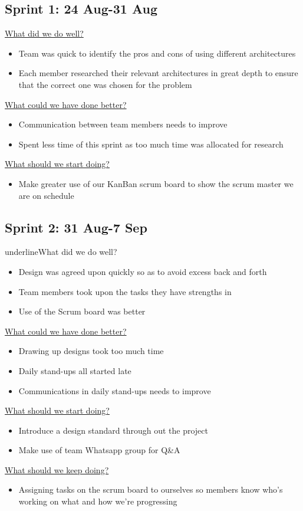 \documentclass[12pt]{article}
\begin{document}
\subsection{Sprint 1: 24 Aug-31 Aug}
\underline{What did we do well?}
\begin{itemize}
\item Team was quick to identify the pros and cons of using different architectures
\item Each member researched their relevant architectures in great depth to ensure that the correct one was chosen for the problem 
\end{itemize}
\underline{What could we have done better?}
\begin{itemize}
\item Communication between team members needs to improve 
\item Spent less time of this sprint as too much time was allocated for research 
\end{itemize}
\underline{What should we start doing?}
\begin{itemize}
\item Make greater use of our KanBan scrum board to show the scrum master we are on schedule
\end{itemize}

\subsection{Sprint 2: 31 Aug-7 Sep}
underline{What did we do well?}
\begin{itemize}
\item Design was agreed upon quickly so as to avoid excess back and forth
\item Team members took upon the tasks they have strengths in
\item Use of the Scrum board was better
\end{itemize}
\underline{What could we have done better?}
\begin{itemize}
\item Drawing up designs took too much time
\item Daily stand-ups all started late
\item Communications in daily stand-ups needs to improve
\end{itemize}
\underline{What should we start doing?}
\begin{itemize}
\item Introduce a design standard through out the project
\item Make use of team Whatsapp group for Q\&A
\end{itemize}
\underline{What should we keep doing?}
\begin{itemize}
\item Assigning tasks on the scrum board to ourselves so members know who's working on what and how we're progressing 
\end{itemize}
\end{document}
